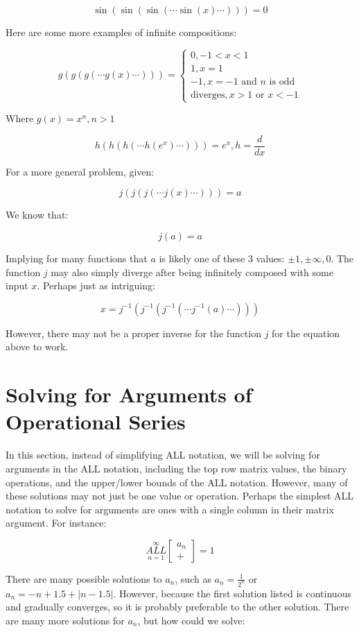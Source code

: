\documentclass{article}
\begin{document}
$$\sin ( \sin ( \sin (\cdots \sin (x) \cdots)))=0 $$

Here are some more examples of infinite compositions:

$$g(g(g(\cdots g(x) \cdots ))) = \left\{ \begin{array}{rcl}
0,-1<x<1 \\ 1, x=1 \\ -1, x=-1 \text{ and } n \text{ is odd} \\ \text{diverges}, x>1 \text{ or } x<-1\end{array}\right.$$

Where $g(x) = x^n, n>1$

$$h(h(h(\cdots h(e^x) \cdots ))) = e^x, h=\frac{d}{dx}$$

For a more general problem, given:

$$j(j(j( \cdots j(x) \cdots)))=a$$

We know that:

$$j(a)=a$$

Implying for many functions that $a$ is likely one of these 3 values: $\pm 1, \pm \infty, 0$. The function $j$ may also simply diverge after being infinitely composed with some input $x$. Perhaps just as intriguing:

$$x=j^{-1}(j^{-1}(j^{-1}( \cdots j^{-1}(a) \cdots )))$$

However, there may not be a proper inverse for the function $j$ for the equation above to work.

\section{Solving for Arguments of Operational Series}

In this section, instead of simplifying ALL notation, we will be solving for arguments in the ALL notation, including the top row matrix values, the binary operations, and the upper/lower bounds of the ALL notation. However, many of these solutions may not just be one value or operation. Perhaps the simplest ALL notation to solve for arguments are ones with a single column in their matrix argument. For instance:

$$\underset{n=1}{\overset{\infty}{ALL}} \begin{bmatrix}
a_n \\
+
\end{bmatrix} = 1$$

There are many possible solutions to $a_n$, such as $a_n = \frac{1}{2^n}$ or $a_n = -n+1.5+|n-1.5|$. However, because the first solution listed is continuous and gradually converges, so it is probably preferable to the other solution. There are many more solutions for $a_n$, but how could we solve:
\end{document}
